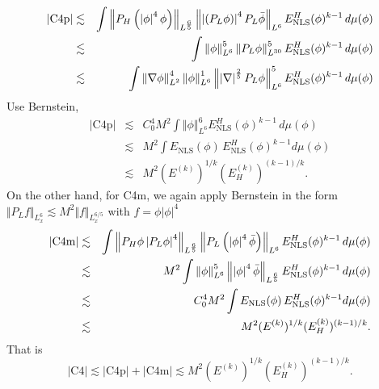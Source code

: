 \documentclass[12pt,letterpaper,leqno]{amsart}
\theoremstyle{plain}
\numberwithin{equation}{section}
\numberwithin{theorem}{section}
\numberwithin{proposition}{section}
\numberwithin{lemma}{section}
\numberwithin{corollary}{section}
\begin{document}
\begin{eqnarray*}
\left\vert \text{C4p}\right\vert &\lesssim &\int \left\Vert P_{H}\left(
\left\vert \phi \right\vert ^{4}\phi \right) \right\Vert _{L^{\frac{6}{5}%
}}\left\Vert \left\vert \left( P_{L}\phi \right) \right\vert ^{4}P_{L}\bar{%
\phi}\right\Vert _{L^{6}}E_{\text{NLS}}^{H}(\phi )^{k-1}\,d\mu (\phi ) \\
&\lesssim &\int \left\Vert \phi \right\Vert _{L^{6}}^{5}\left\Vert P_{L}\phi
\right\Vert _{L^{30}}^{5}E_{\text{NLS}}^{H}(\phi )^{k-1}\,d\mu (\phi ) \\
&\lesssim &\int \left\Vert \nabla \phi \right\Vert _{L^{2}}^{4}\left\Vert
\phi \right\Vert _{L^{6}}^{1}\left\Vert \left\vert \nabla \right\vert ^{%
\frac{2}{5}}P_{L}\phi \right\Vert _{L^{6}}^{5}E_{\text{NLS}}^{H}(\phi
)^{k-1}\,d\mu (\phi )
\end{eqnarray*}%
Use Bernstein,%
\begin{eqnarray*}
\left\vert \text{C4p}\right\vert &\lesssim &C_{0}^{4}M^{2}\int \left\Vert
\phi \right\Vert _{L^{6}}^{6}E_{\text{NLS}}^{H}(\phi )^{k-1}\,d\mu (\phi ) \\
&\lesssim &M^{2}\int E_{\text{NLS}}(\phi )\,E_{\text{NLS}}^{H}(\phi
)^{k-1}d\mu (\phi ) \\
&\lesssim &M^{2}(E^{(k)})^{1/k}(E_{H}^{(k)})^{(k-1)/k}.
\end{eqnarray*}%
On the other hand, for C4m, we again apply Bernstein in the form $\Vert
P_{L}f\Vert _{L_{x}^{6}}\lesssim M^{2}\Vert f\Vert _{L_{x}^{6/5}}$ with $%
f=\phi |\phi |^{4}$%
\begin{eqnarray*}
\left\vert \text{C4m}\right\vert &\lesssim &\int \left\Vert P_{H}\phi
\left\vert P_{L}\phi \right\vert ^{4}\right\Vert _{L^{\frac{6}{5}%
}}\left\Vert P_{L}\left( \left\vert \phi \right\vert ^{4}\bar{\phi}\right)
\right\Vert _{L^{6}}E_{\text{NLS}}^{H}(\phi )^{k-1}\,d\mu (\phi ) \\
&\lesssim &M^{2}\int \left\Vert \phi \right\Vert _{L^{6}}^{5}\left\Vert
\left\vert \phi \right\vert ^{4}\bar{\phi}\right\Vert _{L^{\frac{6}{5}}}E_{%
\text{NLS}}^{H}(\phi )^{k-1}\,d\mu (\phi ) \\
&\lesssim &C_{0}^{4}M^{2}\int E_{\text{NLS}}(\phi )\,E_{\text{NLS}}^{H}(\phi
)^{k-1}d\mu (\phi ) \\
&\lesssim &M^{2}(E^{(k)})^{1/k}(E_{H}^{(k)})^{(k-1)/k}.
\end{eqnarray*}%
That is%
\begin{equation*}
\left\vert \text{C4}\right\vert \lesssim \left\vert \text{C4p}\right\vert
+\left\vert \text{C4m}\right\vert \lesssim
M^{2}(E^{(k)})^{1/k}(E_{H}^{(k)})^{(k-1)/k}.
\end{equation*}%
\end{document}
